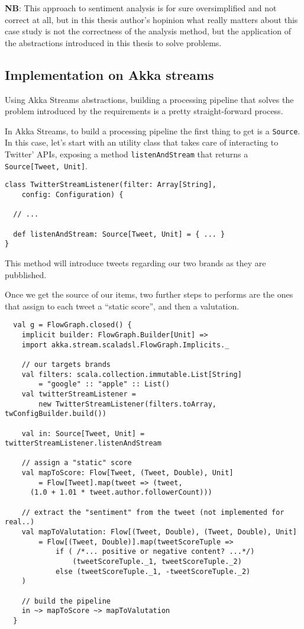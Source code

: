 \textbf{NB}: This approach to sentiment analysis is for sure
oversimplified and not correct at all, but in this thesis author's
hopinion what really matters about this case study is not the
correctness of the analysis method, but the application of the
abstractions introduced in this thesis to solve problems.

\subsection{Implementation on Akka
streams}\label{implementation-on-akka-streams}

Using Akka Streams abstractions, building a processing pipeline that
solves the problem introduced by the requirements is a pretty
straight-forward process.

In Akka Streams, to build a processing pipeline the first thing to get
is a \texttt{Source}. In this case, let's start with an utility class
that takes care of interacting to Twitter' APIs, exposing a method
\texttt{listenAndStream} that returns a
\texttt{Source{[}Tweet,\ Unit{]}}.

\begin{verbatim}
class TwitterStreamListener(filter: Array[String],
    config: Configuration) {

  // ...

  def listenAndStream: Source[Tweet, Unit] = { ... }
}
\end{verbatim}

This method will introduce tweets regarding our two brands as they are
pubblished.

Once we get the source of our items, two further steps to performs are
the ones that assign to each tweet a ``static score'', and then a
valutation.

\begin{verbatim}
  val g = FlowGraph.closed() {
    implicit builder: FlowGraph.Builder[Unit] =>
    import akka.stream.scaladsl.FlowGraph.Implicits._

    // our targets brands
    val filters: scala.collection.immutable.List[String]
        = "google" :: "apple" :: List()
    val twitterStreamListener =
        new TwitterStreamListener(filters.toArray, twConfigBuilder.build())

    val in: Source[Tweet, Unit] = twitterStreamListener.listenAndStream

    // assign a "static" score
    val mapToScore: Flow[Tweet, (Tweet, Double), Unit]
        = Flow[Tweet].map(tweet => (tweet,
      (1.0 + 1.01 * tweet.author.followerCount)))

    // extract the "sentiment" from the tweet (not implemented for real..)
    val mapToValutation: Flow[(Tweet, Double), (Tweet, Double), Unit]
        = Flow[(Tweet, Double)].map(tweetScoreTuple =>
            if ( /*... positive or negative content? ...*/)
                (tweetScoreTuple._1, tweetScoreTuple._2)
            else (tweetScoreTuple._1, -tweetScoreTuple._2)
    )

    // build the pipeline
    in ~> mapToScore ~> mapToValutation
  }
\end{verbatim}

